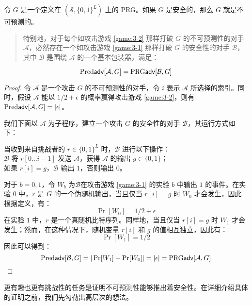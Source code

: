 \begin{theorem}
令 $G$ 是一个定义在 $(\mathcal{S},\{0,1\}^L)$ 上的 PRG。如果 $G$ 是安全的，那么 $G$ 就是不可预测的。
\begin{quote}
特别地，对于每个如攻击游戏 \ref{game:3-2} 那样打破 $G$ 的不可预测性的对手 $\mathcal{A}$，必然存在一个如攻击游戏 \ref{game:3-1} 那样打破 $G$ 的安全性的对手 $\mathcal{B}$，其中 $\mathcal{B}$ 是围绕 $\mathcal{A}$ 的一个基本包装器，满足：
\end{quote}
$$
{\rm Pred\mathsf{adv}}[\mathcal{A},G]={\rm PRG\mathsf{adv}}[\mathcal{B},G]
$$
\end{theorem}

\begin{proof}
令 $\mathcal{A}$ 是一个攻击 $G$ 的不可预测性的对手，令 $i$ 表示 $\mathcal{A}$ 所选择的索引。同时，假设 $\mathcal{A}$ 能以 ${1}/{2}+\epsilon$ 的概率赢得攻击游戏 \ref{game:3-2}，则有${\rm Pred\mathsf{adv}}[\mathcal{A},G]=|\epsilon|$。

我们下面以 $\mathcal{A}$ 为子程序，建立一个攻击 $G$ 的安全性的对手 $\mathcal{B}$，其运行方式如下：

\vspace*{5pt}

\hspace*{5pt} 当收到来自挑战者的 $r\in\{0,1\}^L$ 时，$\mathcal B$ 进行以下操作：\\
\hspace*{50pt} $\mathcal{B}$ 将 $r[0\dots i-1]$ 发送 $\mathcal{A}$，获得 $\mathcal{A}$ 的输出 $g\in\{0,1\}$；\\
\hspace*{50pt} 如果 $r[i]=g$，$\mathcal{B}$ 输出 $1$，否则输出 $0$。

\vspace*{5pt}

对于 $b=0,1$，令 $W_b$ 为$\mathcal{B}$在攻击游戏 \ref{game:3-1} 的实验 $b$ 中输出 $1$ 的事件。在实验 $0$ 中，$r$ 是 $G$ 的一个伪随机输出，当且仅当 $r[i]=g$ 时 $W_0$ 才会发生，因此根据定义，有：
$$
\Pr[W_0]={1}/{2}+\epsilon
$$
在实验 $1$ 中，$r$ 是一个真随机比特序列。同样地，当且仅当 $r[i]=g$ 时 $W_1$ 才会发生；然而，在这种情况下，随机变量 $r[i]$ 和 $g$ 的值相互独立，因此有：
$$
\Pr[W_1]={1}/{2}
$$
因此可以得到：
$$
{\rm Pred\mathsf{adv}}[\mathcal{B},G]=|\Pr[W_1]-\Pr[W_0]|=|\epsilon|={\rm PRG\mathsf{adv}}[\mathcal{A},G]
$$
\end{proof}

更有趣也更有挑战性的任务是证明不可预测性能够推出着安全性。在详细介绍具体的证明之前，我们先勾勒出高层次的想法。

